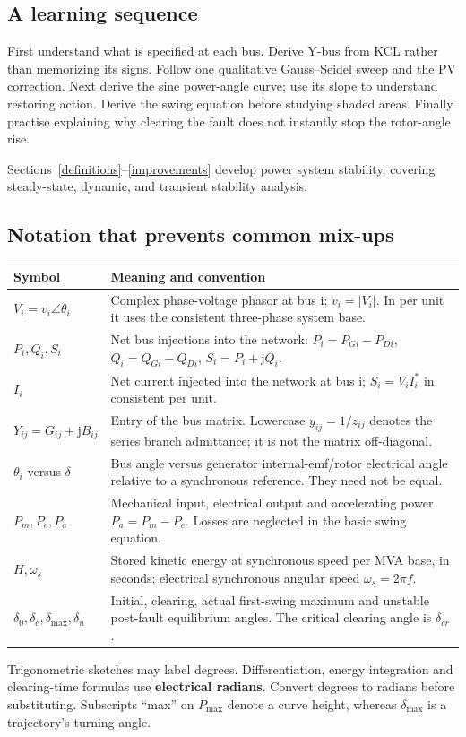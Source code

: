 \documentclass[11pt,a4paper]{article}
\newenvironment{Idea}[1]{\begin{tcolorbox}[colback=pale,colframe=teal,coltitle=white,title={#1}]}{\end{tcolorbox}}
\newcommand{\jj}{\mathrm j}
\begin{document}
\subsection{A learning sequence}
First understand what is specified at each bus. Derive Y-bus from KCL rather than memorizing its signs. Follow one qualitative Gauss--Seidel sweep and the PV correction. Next derive the sine power-angle curve; use its slope to understand restoring action. Derive the swing equation before studying shaded areas. Finally practise explaining why clearing the fault does not instantly stop the rotor-angle rise.

Sections~\ref{definitions}--\ref{improvements} develop power system stability, covering steady-state, dynamic, and transient stability analysis.
\subsection{Notation that prevents common mix-ups}
\begin{center}\small\begin{tabularx}{\textwidth}{L{.20\textwidth}Y}
\toprule Symbol & Meaning and convention\\\midrule
$V_i=v_i\angle\theta_i$ & Complex phase-voltage phasor at bus i; $v_i=|V_i|$. In per unit it uses the consistent three-phase system base.\\
$P_i,Q_i,S_i$ & Net bus injections into the network: $P_i=P_{Gi}-P_{Di}$, $Q_i=Q_{Gi}-Q_{Di}$, $S_i=P_i+\jj Q_i$.\\
$I_i$ & Net current injected into the network at bus i; $S_i=V_iI_i^*$ in consistent per unit.\\
$Y_{ij}=G_{ij}+\jj B_{ij}$ & Entry of the bus matrix. Lowercase $y_{ij}=1/z_{ij}$ denotes the series branch admittance; it is not the matrix off-diagonal.\\
$\theta_i$ versus $\delta$ & Bus angle versus generator internal-emf/rotor electrical angle relative to a synchronous reference. They need not be equal.\\
$P_m,P_e,P_a$ & Mechanical input, electrical output and accelerating power $P_a=P_m-P_e$. Losses are neglected in the basic swing equation.\\
$H,\omega_s$ & Stored kinetic energy at synchronous speed per MVA base, in seconds; electrical synchronous angular speed $\omega_s=2\pi f$.\\
$\delta_0,\delta_c,\delta_{\max},\delta_u$ & Initial, clearing, actual first-swing maximum and unstable post-fault equilibrium angles. The critical clearing angle is $\delta_{cr}$.\\\bottomrule
\end{tabularx}\end{center}
\begin{Idea}{Angles in equations}
Trigonometric sketches may label degrees. Differentiation, energy integration and clearing-time formulas use \textbf{electrical radians}. Convert degrees to radians before substituting. Subscripts ``max'' on $P_{\max}$ denote a curve height, whereas $\delta_{\max}$ is a trajectory's turning angle.
\end{Idea}
\end{document}
